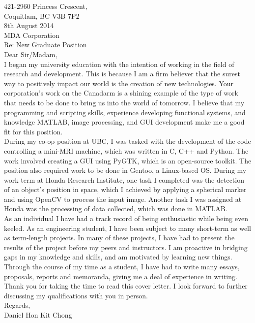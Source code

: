 \documentclass[10pt,a4paper]{article}
\begin{document}
\flushleft
\large
421-2960 Princess Crescent,\\
Coquitlam, BC V3B 7P2 \\
\medskip
8th August 2014 \\
\medskip
MDA Corporation\\
\medskip
Re: New Graduate Position\\
\medskip
Dear Sir/Madam,\\

\medskip
\hspace{10mm}
I began my university education with the intention of working in the field of research and development. This is because I am a firm believer that the 
surest way to positively impact our world is the creation of new technologies. Your corporation's work on the Canadarm is a shining example of the type
of work that needs to be done to bring us into the world of tomorrow. I believe that my programming and scripting skills, experience developing 
functional systems, and knowledge MATLAB, image processing, and GUI development make me a good fit for this position.\\
\medskip
\hspace{10mm}
During my co-op position at UBC, I was tasked with the development of the code controlling a mini-MRI machine, which was written in C, C++ and Python.
The work involved creating a GUI using PyGTK, which is an open-source toolkit. The position also required work to be done in Gentoo, a Linux-based OS. 
During my work term at Honda Research Institute, one task I completed was the detection of an object's position in space, which I achieved by applying
a spherical marker and using OpenCV to process the input image.
Another task I was assigned at Honda was the processing of data collected, which was done in MATLAB.\\
\medskip
\hspace{10mm}
As an individual I have had a track record of being enthusiastic while being even keeled. 
As an engineering student, I have been subject to many short-term as well as term-length projects.
In many of these projects, I have had to present the results of the project before my peers and instructors.
I am proactive in bridging gaps in my knowledge and skills, and am motivated by learning new things.
Through the course of my time as a student, I have had to write many essays, proposals, reports and memoranda, giving me a deal of experience in writing.
Thank you for taking the time to read this cover letter.
I look forward to further discussing my qualifications with you in person.\\


\bigskip
Regards, \\
Daniel Hon Kit Chong
\end{document}
